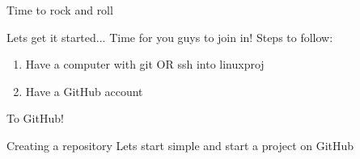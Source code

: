 \begin{frame}{Time to rock and roll}
    \begin{block}{Lets get it started...}
        Time for you guys to join in!
        Steps to follow:
        \begin{enumerate}
            \item Have a computer with git OR ssh into linuxproj
            \item Have a GitHub account
        \end{enumerate}
    \end{block}
\end{frame}
\begin{frame}{To GitHub!}
    \begin{exampleblock}{Creating a repository}
        Lets start simple and start a project on GitHub
    \end{exampleblock}
\end{frame}

